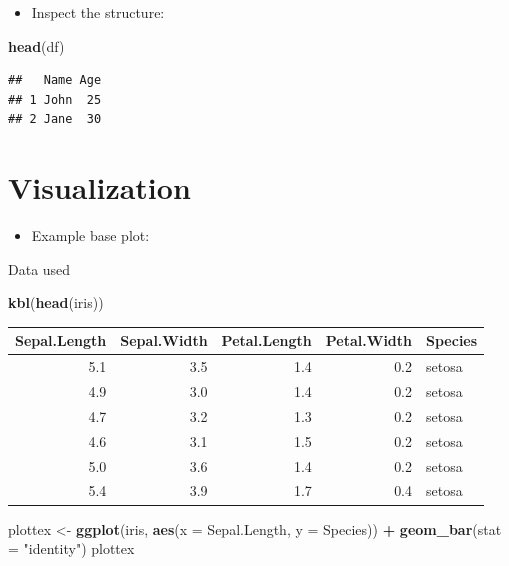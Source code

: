 \documentclass[
]{book}
\newenvironment{Shaded}{\begin{snugshade}}{\end{snugshade}}
\newcommand{\AttributeTok}[1]{\textcolor[rgb]{0.13,0.29,0.53}{#1}}
\newcommand{\FunctionTok}[1]{\textcolor[rgb]{0.13,0.29,0.53}{\textbf{#1}}}
\newcommand{\NormalTok}[1]{#1}
\newcommand{\OtherTok}[1]{\textcolor[rgb]{0.56,0.35,0.01}{#1}}
\newcommand{\SpecialCharTok}[1]{\textcolor[rgb]{0.81,0.36,0.00}{\textbf{#1}}}
\newcommand{\StringTok}[1]{\textcolor[rgb]{0.31,0.60,0.02}{#1}}
\providecommand{\tightlist}{%
  \setlength{\itemsep}{0pt}\setlength{\parskip}{0pt}}
\begin{document}
\begin{itemize}
\tightlist
\item
  Inspect the structure:
\end{itemize}

\begin{Shaded}
\begin{Highlighting}[]
\FunctionTok{head}\NormalTok{(df)}
\end{Highlighting}
\end{Shaded}

\begin{verbatim}
##   Name Age
## 1 John  25
## 2 Jane  30
\end{verbatim}

\hypertarget{visualization}{%
\section{Visualization}\label{visualization}}

\begin{itemize}
\tightlist
\item
  Example base plot:
\end{itemize}

Data used

\begin{Shaded}
\begin{Highlighting}[]
\FunctionTok{kbl}\NormalTok{(}\FunctionTok{head}\NormalTok{(iris))}
\end{Highlighting}
\end{Shaded}

\begin{tabular}[t]{r|r|r|r|l}
\hline
Sepal.Length & Sepal.Width & Petal.Length & Petal.Width & Species\\
\hline
5.1 & 3.5 & 1.4 & 0.2 & setosa\\
\hline
4.9 & 3.0 & 1.4 & 0.2 & setosa\\
\hline
4.7 & 3.2 & 1.3 & 0.2 & setosa\\
\hline
4.6 & 3.1 & 1.5 & 0.2 & setosa\\
\hline
5.0 & 3.6 & 1.4 & 0.2 & setosa\\
\hline
5.4 & 3.9 & 1.7 & 0.4 & setosa\\
\hline
\end{tabular}

\begin{Shaded}
\begin{Highlighting}[]
\NormalTok{plottex }\OtherTok{\textless{}{-}} \FunctionTok{ggplot}\NormalTok{(iris, }
       \FunctionTok{aes}\NormalTok{(}\AttributeTok{x =}\NormalTok{ Sepal.Length, }
           \AttributeTok{y =}\NormalTok{ Species)) }\SpecialCharTok{+} 
  \FunctionTok{geom\_bar}\NormalTok{(}\AttributeTok{stat =} \StringTok{"identity"}\NormalTok{)}
\NormalTok{plottex}
\end{Highlighting}
\end{Shaded}
\end{document}
